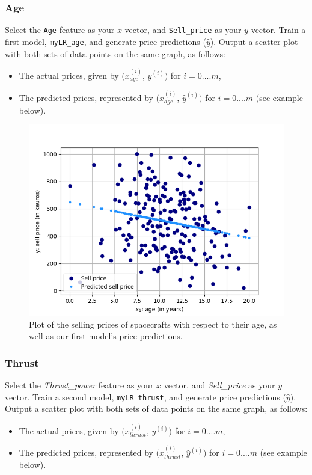 \documentclass{42-en}
\begin{document}
\subsubsection*{Age}
Select the \texttt{Age} feature as your $x$ vector, and \texttt{Sell\_price} as your $y$ vector.
Train a first model, \texttt{myLR\_age}, and generate price predictions ($\hat{y}$).
Output a scatter plot with both sets of data points on the same graph, as follows:
\begin{itemize}
  \item The actual prices, given by $(x_{age}^{(i)}$, $y^{(i)})$  for $i=0....m$,
  \item The predicted prices, represented by  $(x_{age}^{(i)}$, $\hat{y}^{(i)})$  for $i=0....m$ (see example below).
\end{itemize}

\begin{figure}[!h]
  \centering
  \includegraphics[scale=0.6]{assets/ex07_price_vs_age_part1.png}
  \caption{Plot of the selling prices of spacecrafts with respect to their age, as well as our first model's price predictions.}
\end{figure}

\subsubsection*{Thrust}
Select the \textit{Thrust\_power} feature as your $x$ vector, and \textit{Sell\_price} as your $y$ vector.
Train a second model, \texttt{myLR\_thrust}, and generate price predictions ($\hat{y}$).
Output a scatter plot with both sets of data points on the same graph, as follows:
\begin{itemize}
  \item The actual prices, given by $(x_{thrust}^{(i)}$, $y^{(i)})$  for $i=0....m$,
  \item The predicted prices, represented by  $(x_{thrust}^{(i)}$, $\hat{y}^{(i)})$  for $i=0....m$ (see example below).
\end{itemize}
\end{document}
